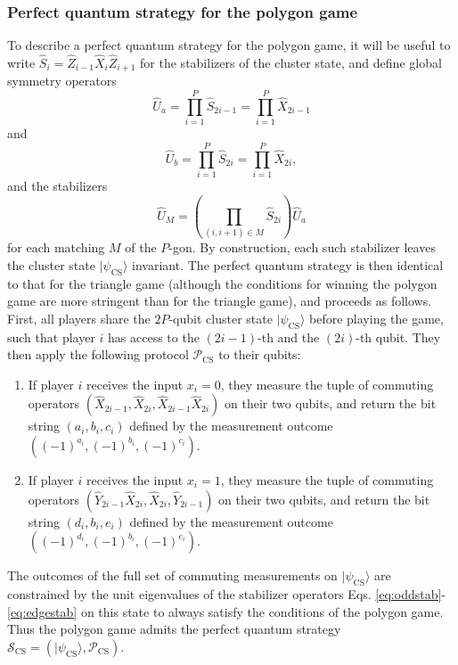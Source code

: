 \documentclass[prb,twocolumn,showpacs,amssymb,superscriptaddress]{revtex4-2}
\begin{document}
\subsubsection{Perfect quantum strategy for the polygon game}
To describe a perfect quantum strategy for the polygon game, it will be useful to write $\hat{S}_i = \hat{Z}_{i-1}\hat{X}_i \hat{Z}_{i+1}$ for the stabilizers of the cluster state, and define global symmetry operators
\begin{equation}
\label{eq:oddstab}
\hat{U}_a = \prod_{i=1}^{P} \hat{S}_{2i-1} = \prod_{i=1}^{P} \hat{X}_{2i-1}
\end{equation}
and
\begin{equation}
\label{eq:evenstab}
\hat{U}_b = \prod_{i=1}^{P} \hat{S}_{2i} = \prod_{i=1}^{P} \hat{X}_{2i},
\end{equation}
and the stabilizers
\begin{equation}
\label{eq:edgestab}
\hat{U}_M = \left(\prod_{(i,i+1)\in M} \hat{S}_{2i} \right) \hat{U}_a
\end{equation}
for each matching $M$ of the $P$-gon. By construction, each such stabilizer leaves the cluster state $|\psi_{\mathrm{CS}} \rangle$ invariant. The perfect quantum strategy is then identical to that for the triangle game\cite{Bravyi,DanielMiyake} (although the conditions for winning the polygon game are more stringent than for the triangle game), and proceeds as follows. First, all players share the $2P$-qubit cluster state $|\psi_{\mathrm{CS}}\rangle$ before playing the game, such that player $i$ has access to the $(2i-1)$-th and the $(2i)$-th qubit. They then apply the following protocol $\mathcal{P}_{\mathrm{CS}}$ to their qubits:
\begin{enumerate}
    \item If player $i$ receives the input $x_i=0$, they measure the tuple of commuting operators $(\hat{X}_{2i-1},\hat{X}_{2i},\hat{X}_{2i-1}\hat{X}_{2i})$ on their two qubits, and return the bit string $(a_i,b_i,c_i)$ defined by the measurement outcome $((-1)^{a_i},(-1)^{b_i},(-1)^{c_i})$.
    \item If player $i$ receives the input $x_i=1$, they measure the tuple of commuting operators $(\hat{Y}_{2i-1}\hat{X}_{2i},\hat{X}_{2i},\hat{Y}_{2i-1})$ on their two qubits, and return the bit string $(d_i,b_i,e_i)$ defined by the measurement outcome $((-1)^{d_i},(-1)^{b_i},(-1)^{e_i})$.
\end{enumerate}
The outcomes of the full set of commuting measurements on $|\psi_{\mathrm{CS}}\rangle$ are constrained by the unit eigenvalues of the stabilizer operators Eqs. \eqref{eq:oddstab}-\eqref{eq:edgestab} on this state to always satisfy the conditions of the polygon game. Thus the polygon game admits the perfect quantum strategy $\mathcal{S}_{\mathrm{CS}} = (|\psi_{\mathrm{CS}}\rangle,\mathcal{P}_{\mathrm{CS}})$.
\end{document}
